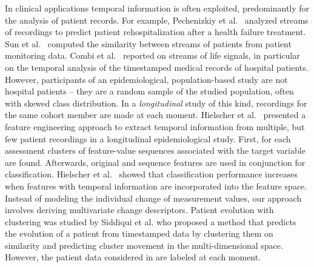 \documentclass[
  oneside]{book}
\begin{document}
In clinical applications temporal information is often exploited, predominantly for the analysis of patient records.
For example, Pechenizkiy et al.~\autocite{PechenizkiyEtAl:CBMS10} analyzed streams of recordings to predict patient rehospitalization after a health failure treatment.
Sun et al.~\autocite{SunEtAl:ICDM10} computed the similarity between streams of patients from patient monitoring data.
Combi et al.~\autocite{CombiEtAl:2010} reported on streams of life signals, in particular on the temporal analysis of the timestamped medical records of hospital patients.
However, participants of an epidemiological, population-based study are not hospital patients -- they are a random sample of the studied population, often with skewed class distribution.
In a \emph{longitudinal} study of this kind, recordings for the same cohort member are made at each moment.
Hielscher et al.~\autocite{HielscherEtAl:IDA14} presented a feature engineering approach to extract temporal information from multiple, but few patient recordings in a longitudinal epidemiological study.
First, for each assessment clusters of feature-value sequences associated with the target variable are found.
Afterwards, original and sequence features are used in conjunction for classification.
Hielscher et al.~\autocite{HielscherEtAl:IDA14} showed that classification performance increases when features with temporal information are incorporated into the feature space.
Instead of modeling the individual change of measurement values, our approach involves deriving multivariate change descriptors.
Patient evolution with clustering was studied by Siddiqui et al. \autocite{SiddiquiEtAl:BIH14} who proposed a method that predicts the evolution of a patient from timestamped data by clustering them on similarity and predicting cluster movement in the multi-dimensional space. However, the patient data considered in \autocite{SiddiquiEtAl:BIH14} are labeled at each moment.
\end{document}
